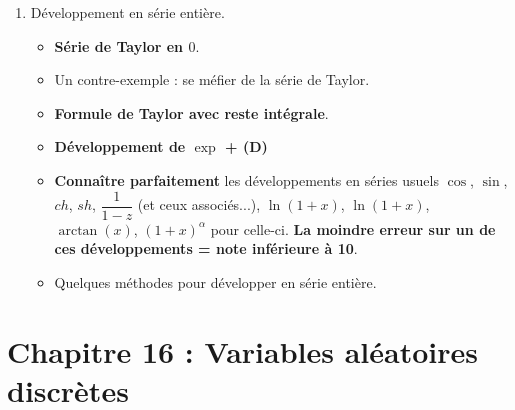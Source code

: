 \documentclass[twoside,a4paper,french,10pt]{VcCours}
\begin{document}
\begin{enumerate}
\begin{itemize}
{l'expression en fonction de ces dérivées (corollaire 14)}.
\item Unicité du développement en série entière.
\end{itemize}
\item Développement en série entière.
\begin{itemize}
\item \textbf{Série de Taylor en $0$}.
\item Un contre-exemple : se méfier de la série de Taylor. 
\item \textbf{Formule de Taylor avec reste intégrale}.
\item \textbf{Développement de $\exp$ + (D)}
\item \textbf{Connaître parfaitement} les développements en séries usuels 
$\cos$, $\sin$, $ch$, $sh$, $\dfrac{1}{1-z}$ (et ceux associés...), 
$\ln(1+x)$, $\ln(1+x)$, $\arctan(x)$, $(1+x)^{\alpha}$%
pour celle-ci. \textbf{La moindre erreur sur un de ces développements 
= note inférieure à 10}.
\item Quelques méthodes pour développer en série entière.
\end{itemize}
\end{enumerate}

\section*{Chapitre 16 : Variables aléatoires discrètes}
  
\end{document}
